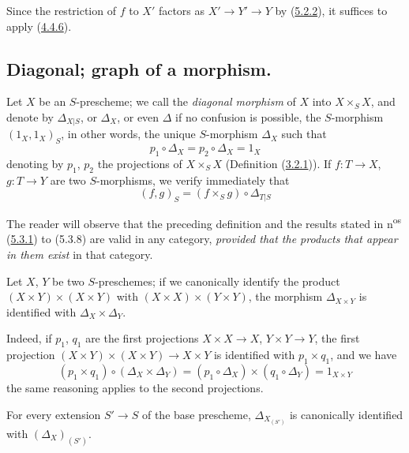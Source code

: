 Since the restriction of $f$ to $X'$ factors as
$X'\to Y'\to Y$ by (\hyperref[I.5.2.2]{5.2.2}), it suffices to apply
(\hyperref[I.4.4.6]{4.4.6}).

\subsection{Diagonal; graph of a morphism.}
\label{subsection:I.5.3}

\begin{env}[5.3.1]
\label{I.5.3.1}
Let $X$ be an $S$-prescheme; we call the \emph{diagonal morphism} of $X$ into
$X\times_S X$, and denote by $\Delta_{X|S}$, or $\Delta_X$, or even $\Delta$ if
no confusion is possible, the $S$-morphism $(1_X,1_X)_S$, in other
words, the unique $S$-morphism $\Delta_X$ such that
\[
  p_1\circ\Delta_X=p_2\circ\Delta_X=1_X
  \tag{5.3.1.1}\label{I.5.3.1.1}
\]
denoting by $p_1$, $p_2$ the projections of $X\times_S X$
(Definition (\hyperref[I.3.2.1]{3.2.1})). If $f:T\to X$, $g:T\to Y$ are two
$S$-morphisms, we verify immediately that
\[
  (f,g)_S=(f\times_S g)\circ\Delta_{T|S}
  \tag{5.3.1.2}\label{I.5.3.1.2}
\]

The reader will observe that the preceding definition and the results stated
in n\textsuperscript{os} (\hyperref[I.5.3.1]{5.3.1}) to (5.3.8) are
valid in any category, \emph{provided that the products that appear in them
exist} in that category.
\end{env}

\begin{proposition}[5.3.2]
\label{I.5.3.2}
Let $X$, $Y$ be two $S$-preschemes; if we canonically identify the product
$(X\times Y)\times(X\times Y)$ with $(X\times X)\times(Y\times Y)$, the morphism
$\Delta_{X\times Y}$ is identified with $\Delta_X\times\Delta_Y$.
\end{proposition}

Indeed, if $p_1$, $q_1$ are the first projections
$X\times X\to X$, $Y\times Y\to Y$, the first projection
$(X\times Y)\times(X\times Y)\to X\times Y$ is identified with $p_1\times q_1$,
and we have
\[
  (p_1\times q_1)\circ(\Delta_X\times\Delta_Y)
  =(p_1\circ\Delta_X)\times(q_1\circ\Delta_Y)=1_{X\times Y}
\]
the same reasoning applies to the second projections.

\begin{corollary}[5.3.4]
\label{I.5.3.4}
For every extension $S'\to S$ of the base prescheme,
$\Delta_{X_{(S')}}$ is canonically identified with $(\Delta_X)_{(S')}$.
\end{corollary}

